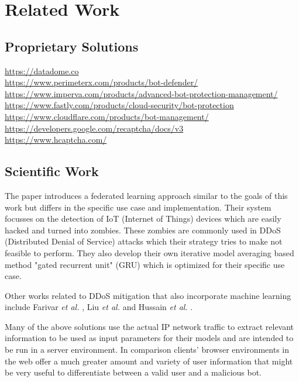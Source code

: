 \documentclass[
    fontsize=12pt,
    headings=small,
    parskip=half,           %
    bibliography=totoc,
    numbers=noenddot,       %
    open=any,               %
    ]{scrreprt}
\begin{document}
\chapter{Related Work}

\section{Proprietary Solutions}

\url{https://datadome.co} \\
\url{https://www.perimeterx.com/products/bot-defender/} \\
\url{https://www.imperva.com/products/advanced-bot-protection-management/} \\
\url{https://www.fastly.com/products/cloud-security/bot-protection} \\
\url{https://www.cloudflare.com/products/bot-management/} \\
\url{https://developers.google.com/recaptcha/docs/v3} \\
\url{https://www.hcaptcha.com/} \\


\section{Scientific Work}

The paper \cite{LiJi2021} introduces a federated learning approach similar to the goals of this work but differs in the specific use case and implementation. Their system focusses on the detection of IoT (Internet of Things) devices which are easily hacked and turned into zombies. These zombies are commonly used in DDoS (Distributed Denial of Service) attacks which their strategy tries to make not feasible to perform. They also develop their own iterative model averaging based method "gated recurrent unit" (GRU) which is optimized for their specific use case.

Other works related to DDoS mitigation that also incorporate machine learning include Farivar \emph{et al.} \cite{FaFa2020}, Liu \emph{et al.} \cite{8594641} and Hussain \emph{et al.} \cite{9000893}.

Many of the above solutions use the actual IP network traffic to extract relevant information to be used as input parameters for their models and are intended to be run in a server environment. In comparison clients' browser environments in the web offer a much greater amount and variety of user information that might be very useful to differentiate between a valid user and a malicious bot.
\end{document}
